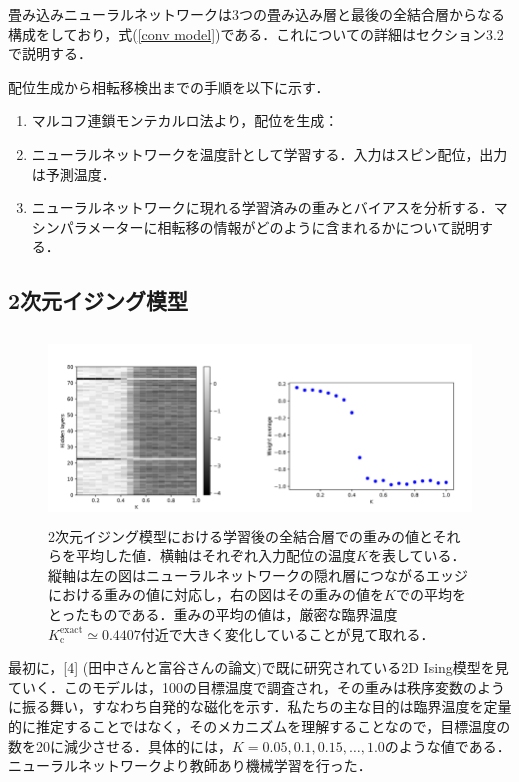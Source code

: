 \documentclass[a4paper,11pt]{jsarticle}
\begin{document}
畳み込みニューラルネットワークは3つの畳み込み層と最後の全結合層からなる構成をしており，式(\ref{conv model})である．これについての詳細はセクション3.2で説明する．\par
配位生成から相転移検出までの手順を以下に示す．
\begin{enumerate}
  \item マルコフ連鎖モンテカルロ法より，配位を生成：
  \item ニューラルネットワークを温度計として学習する．入力はスピン配位，出力は予測温度．
  \item ニューラルネットワークに現れる学習済みの重みとバイアスを分析する．マシンパラメーターに相転移の情報がどのように含まれるかについて説明する．
\end{enumerate}

\subsection{2次元イジング模型}
\begin{figure}[hb]
  \begin{center}
    \includegraphics[height=5cm]{image/Figure1.png}
    \caption{2次元イジング模型における学習後の全結合層での重みの値とそれらを平均した値．横軸はそれぞれ入力配位の温度$K$を表している．縦軸は左の図はニューラルネットワークの隠れ層につながるエッジにおける重みの値に対応し，右の図はその重みの値を$K$での平均をとったものである．重みの平均の値は，厳密な臨界温度$K_{\text{c}}^{\text{exact}}\simeq 0.4407$付近で大きく変化していることが見て取れる．}
  \end{center}
\end{figure}
最初に，[4] (田中さんと富谷さんの論文)で既に研究されている2D Ising模型を見ていく．このモデルは，100の目標温度で調査され，その重みは秩序変数のように振る舞い，すなわち自発的な磁化を示す．私たちの主な目的は臨界温度を定量的に推定することではなく，そのメカニズムを理解することなので，目標温度の数を20に減少させる．具体的には，$K = 0.05, 0.1, 0.15, \dots, 1.0$のような値である．ニューラルネットワークより教師あり機械学習を行った．
\end{document}
